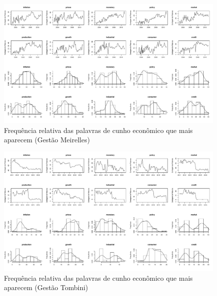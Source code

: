 \begin{landscape}
\begin{figure}
    \centering
    \includegraphics[width=1.5\textwidth]{capitulos/figures/analiseeconomicameirelles.pdf}
    \caption{Frequência relativa das palavras de cunho econômico que mais aparecem (Gestão Meirelles)}
    \label{fig:analiseeconomicameirelles}
\end{figure}
\end{landscape}

\begin{landscape}
\begin{figure}
    \centering
    \includegraphics[width=1.5\textwidth]{capitulos/figures/analiseeconomicatombini.pdf}
    \caption{Frequência relativa das palavras de cunho econômico que mais aparecem (Gestão Tombini)}
    \label{fig:analiseeconomicatombini}
\end{figure}
\end{landscape}

